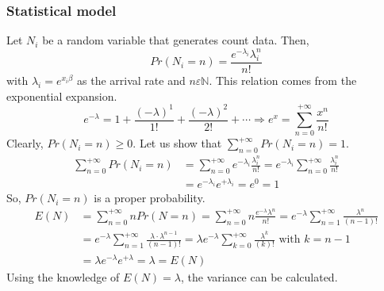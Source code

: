 			\subsubsection{Statistical model}
				Let $N_i$ be a random variable that generates count data. Then,
				\begin{equation*}
					Pr(N_i=n)=\frac{e^{-\lambda_i}\lambda_i^n}{n!}
				\end{equation*}
				with $\lambda_i=e^{x_i\beta}$ as the arrival rate and $n\varepsilon\mathbb{N}$.
				This relation comes from the exponential expansion.
				\begin{equation*}
					e^{-\lambda}=1+\frac{(-\lambda)^1}{1!}+\frac{(-\lambda)^2}{2!}+\cdots\Rightarrow e^x=\sum\limits_{n=0}^{+\infty} \frac{x^n}{n!}
				\end{equation*}%
				Clearly, $Pr(N_i=n)\geq 0$. Let us show that $\sum\limits_{n=0}^{+\infty} Pr(N_i=n)=1$.
				\begin{align*}
					\sum\limits_{n=0}^{+\infty} Pr(N_i=n)&=	\sum\limits_{n=0}^{+\infty} e^{-\lambda_i} \frac{\lambda_i^n}{n!}=e^{-\lambda_i} \sum\limits_{n=0}^{+\infty} \frac{\lambda_i^n}{n!}\\
					&= e^{-\lambda_i} e^{+\lambda_i} = e^0 = 1
				\end{align*}
				So, $Pr(N_i=n)$ is a proper probability.
				\begin{align*}
					E(N)&=	\sum\limits_{n=0}^{+\infty} n Pr(N=n)=	\sum\limits_{n=0}^{+\infty} n \frac{e^{-\lambda}\lambda^n}{n!}=e^{-\lambda} \sum\limits_{n=1}^{+\infty} \frac{\lambda^n}{(n-1)!}\\
					&=e^{-\lambda} \sum\limits_{n=1}^{+\infty} \frac{\lambda\cdot\lambda^{n-1}}{(n-1)!}=\lambda e^{-\lambda} \sum\limits_{k=0}^{+\infty} \frac{\lambda^k}{(k)!}\text{ with }k=n-1\\
					&=\lambda e^{-\lambda} e^{+\lambda}=\lambda=E(N)
				\end{align*}
				Using the knowledge of $E(N)=\lambda$, the variance can be calculated.
